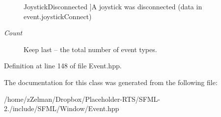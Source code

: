 \begin{Desc}
\begin{description}
{\hypertarget{classsf_1_1Event_af41fa9ed45c02449030699f671331d4aab6e161dab7abaf154cc1c7b554558cb6}{Joystick\-Disconnected}\label{classsf_1_1Event_af41fa9ed45c02449030699f671331d4aab6e161dab7abaf154cc1c7b554558cb6}
}]A joystick was disconnected (data in event.\-joystick\-Connect) \item[{\em 
\hypertarget{classsf_1_1Event_af41fa9ed45c02449030699f671331d4aae51749211243cab2ab270b29cdc32a70}{Count}\label{classsf_1_1Event_af41fa9ed45c02449030699f671331d4aae51749211243cab2ab270b29cdc32a70}
}]Keep last -- the total number of event types. \end{description}
\end{Desc}


Definition at line 148 of file Event.\-hpp.



The documentation for this class was generated from the following file\-:\begin{DoxyCompactItemize}
\item 
/home/z\-Zelman/\-Dropbox/\-Placeholder-\/\-R\-T\-S/\-S\-F\-M\-L-\/2./include/\-S\-F\-M\-L/\-Window/Event.\-hpp\end{DoxyCompactItemize}
